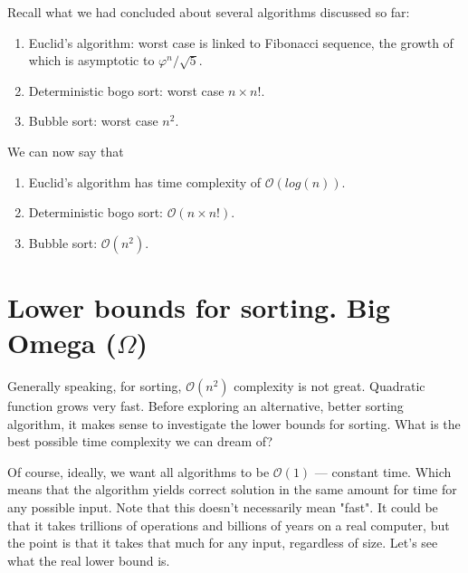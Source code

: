 \documentclass[a4paper, justified, notitlepage, sfsidenotes, notoc]{tufte-book}
\begin{document}

Recall what we had concluded about several algorithms discussed so far:

\begin{enumerate}
\item Euclid's algorithm: worst case is linked to Fibonacci sequence, the growth of which is asymptotic to \(\varphi ^{n}/{\sqrt {5}}\).
\item Deterministic bogo sort: worst case \(n \times n!\).
\item Bubble sort: worst case \(n^{2}\).
\end{enumerate}

We can now say that

\begin{enumerate}
\item Euclid's algorithm has time complexity of \(\mathcal{O}(log(n))\).
\item Deterministic bogo sort: \(\mathcal{O}(n \times n!)\).
\item Bubble sort: \(\mathcal{O}(n^{2})\).
\end{enumerate}

\chapter{Lower bounds for sorting. Big Omega (\(\Omega\))}
\label{sec:org75f05b5}

Generally speaking, for sorting, \(\mathcal{O}(n^{2})\) complexity is not great. Quadratic function grows very fast. Before exploring an alternative, better sorting algorithm, it makes sense to investigate the lower bounds for sorting. What is the best possible time complexity we can dream of?

Of course, ideally, we want all algorithms to be \(\mathcal{O}(1)\) — constant time. Which means that the algorithm yields correct solution in the same amount for time for any possible input. Note that this doesn't necessarily mean "fast". It could be that it takes trillions of operations and billions of years on a real computer, but the point is that it takes that much for any input, regardless of size. Let's see what the real lower bound is.
\end{document}
